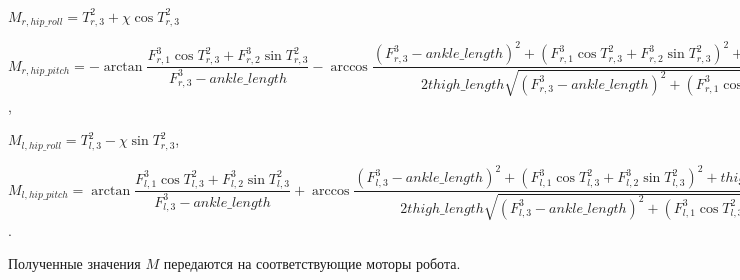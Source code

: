 \begin{center}
$M_{r,hip\_roll} = T^{2}_{r,3} + \chi \cos T^{2}_{r,3}$

$M_{r,hip\_pitch} = -\arctan \dfrac{  F^{3}_{r,1} \cos T^{2}_{r,3} + F^{3}_{r,2} \sin T^{2}_{r,3}  }{  F^{3}_{r,3} - ankle\_length  } - \arccos \dfrac{  (F^{3}_{r,3} - ankle\_length)^{2} + (F^{3}_{r,1} \cos T^{2}_{r,3} + F^{3}_{r,2} \sin T^{2}_{r,3}) ^ {2}  + thigh\_length^{2} - carf\_rength ^ 2 }{ 2 thigh\_length \sqrt{(F^{3}_{r,3} - ankle\_length)^{2} + (F^{3}_{r,1} \cos T^{2}_{r,3} + F^{3}_{r,2} \sin T^{2}_{r,3}) ^ {2}}} + \chi \sin T^{2}_{r,3}$,

$M_{l,hip\_roll} = T^{2}_{l,3} - \chi \sin T^{2}_{r,3}$,

$M_{l,hip\_pitch} = \arctan \dfrac{  F^{3}_{l,1} \cos T^{2}_{l,3} + F^{3}_{l,2} \sin T^{2}_{l,3}  }{  F^{3}_{l,3} - ankle\_length  } + \arccos \dfrac{  (F^{3}_{l,3} - ankle\_length)^{2} + (F^{3}_{l,1} \cos T^{2}_{l,3} + F^{3}_{l,2} \sin T^{2}_{l,3}) ^ {2}  + thigh\_length^{2} - calf\_length ^ 2 }{ 2 thigh\_length \sqrt{(F^{3}_{l,3} - ankle\_length)^{2} + (F^{3}_{l,1} \cos T^{2}_{l,3} + F^{3}_{l,2} \sin T^{2}_{l,3}) ^ {2}}} - \chi \sin T^{2}_{r,3}$.
\end{center}

Полученные значения $M$ передаются на соответствующие моторы робота.